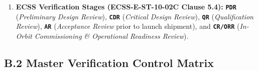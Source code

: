 \begin{enumerate}
\begin{itemize}
        \item \textbf{\texttt{L4-SUB} (Subsystem / Equipment Level):} Verified at unit level on Engineering Models (\texttt{EM}) and Qualification/Flight units ( optical bench,  star trackers/,  boards, and 1,550~nm  terminals).
    \end{itemize}
    \item \textbf{ECSS Verification Stages (\textbf{ECSS-E-ST-10-02C} Clause 5.4):}
    \textbf{\texttt{PDR}} (\emph{Preliminary Design Review}), \textbf{\texttt{CDR}} (\emph{Critical Design Review}), \textbf{\texttt{QR}} (\emph{Qualification Review}), \textbf{\texttt{AR}} (\emph{Acceptance Review} prior to launch shipment), and \textbf{\texttt{CR/ORR}} (\emph{In-Orbit Commissioning \& Operational Readiness Review}).
\end{enumerate}

\subsection{B.2 Master Verification Control Matrix}

